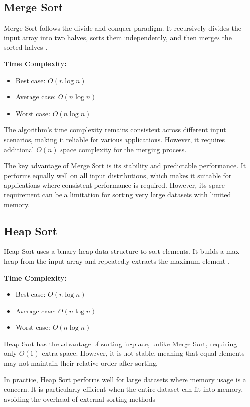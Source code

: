 \documentclass[sigconf]{acmart}
\begin{document}
\subsection{Merge Sort}
Merge Sort follows the divide-and-conquer paradigm. It recursively divides the input array into two halves, sorts them independently, and then merges the sorted halves \cite{knuth1998art}.

\textbf{Time Complexity:}
\begin{itemize}
    \item Best case: $O(n \log n)$
    \item Average case: $O(n \log n)$
    \item Worst case: $O(n \log n)$
\end{itemize}

The algorithm's time complexity remains consistent across different input scenarios, making it reliable for various applications. However, it requires additional $O(n)$ space complexity for the merging process.

The key advantage of Merge Sort is its stability and predictable performance. It performs equally well on all input distributions, which makes it suitable for applications where consistent performance is required. However, its space requirement can be a limitation for sorting very large datasets with limited memory.

\subsection{Heap Sort}
Heap Sort uses a binary heap data structure to sort elements. It builds a max-heap from the input array and repeatedly extracts the maximum element \cite{forsythe1964algorithms}.

\textbf{Time Complexity:}
\begin{itemize}
    \item Best case: $O(n \log n)$
    \item Average case: $O(n \log n)$
    \item Worst case: $O(n \log n)$
\end{itemize}

Heap Sort has the advantage of sorting in-place, unlike Merge Sort, requiring only $O(1)$ extra space. However, it is not stable, meaning that equal elements may not maintain their relative order after sorting.

In practice, Heap Sort performs well for large datasets where memory usage is a concern. It is particularly efficient when the entire dataset can fit into memory, avoiding the overhead of external sorting methods.
\end{document}
